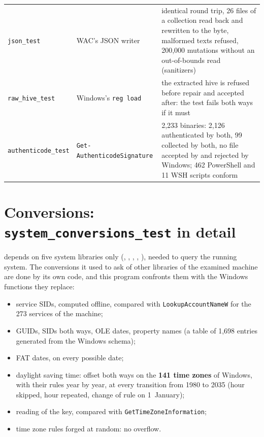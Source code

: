 \documentclass[11pt,a4paper,oneside]{report}
\begin{document}
\begin{longtable}{@{}L{4.6cm}L{3.8cm}L{6.6cm}@{}}
\texttt{json\_test} & WAC's JSON writer & identical round trip, 26 files of a
  collection read back and rewritten to the byte, malformed texts refused,
  200,000 mutations without an out-of-bounds read (sanitizers) \\
\texttt{raw\_hive\_test} & Windows's \texttt{reg load} &
  the extracted hive is refused before repair and accepted after: the test
  fails both ways if it must \\
\texttt{authenticode\_test} & \texttt{Get-Authenticode}\allowbreak\texttt{Signature} &
  2,233 binaries: 2,126 authenticated by both, 99 collected by both, no file
  accepted by \wac{} and rejected by Windows; 462 PowerShell and 11 WSH
  scripts conform \\
\bottomrule
\end{longtable}

\section{Conversions: \texttt{system\_conversions\_test} in detail}

\wac{} depends on five system libraries only (,
, , , ),
needed to query the running system. The conversions it used to ask of other
libraries of the examined machine are done by its own code, and this program
confronts them with the Windows functions they replace:

\begin{itemize}
  \item service SIDs, computed offline, compared with
    \texttt{LookupAccountNameW} for the 273 services of the machine;
  \item GUIDs, SIDs both ways, OLE dates, property names (a table of 1,698
    entries generated from the Windows schema);
  \item FAT dates, on every possible date;
  \item daylight saving time: offset both ways on the \textbf{141 time zones}
    of Windows, with their rules year by year, at every transition from 1980 to
    2035 (hour skipped, hour repeated, change of rule on 1~January);
  \item reading of the  key, compared with
    \texttt{GetTimeZoneInformation};
  \item time zone rules forged at random: no overflow.
\end{itemize}
\end{document}
